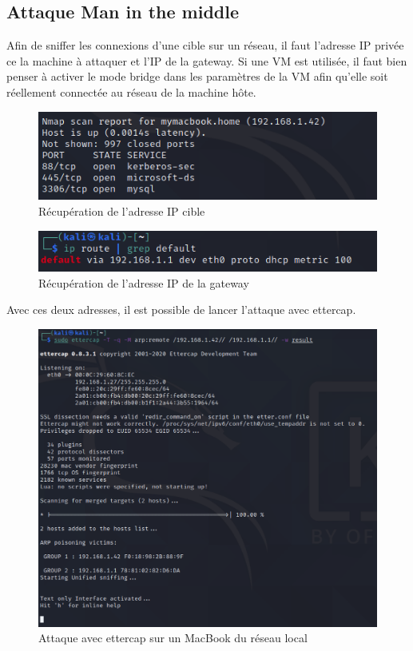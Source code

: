 \documentclass[12pt, oneside]{article}
\begin{document}
\subsection{Attaque Man in the middle}
Afin de sniffer les connexions d'une cible sur un réseau, il faut l'adresse IP privée ce la machine à attaquer et l'IP de la gateway. Si une VM est utilisée, il faut bien penser à activer le mode bridge dans les paramètres de la VM afin qu'elle soit réellement connectée au réseau de la machine hôte.
\begin{figure}[H]
\centering
\includegraphics[scale=0.4]{target}
\caption{Récupération de l'adresse IP cible}
\end{figure}
\begin{figure}[H]
\centering
\includegraphics[scale=0.4]{gateway}
\caption{Récupération de l'adresse IP de la gateway}
\end{figure}
Avec ces deux adresses, il est possible de lancer l'attaque avec ettercap.
\begin{figure}[H]
\centering
\includegraphics[scale=0.4]{ett1}
\caption{Attaque avec ettercap sur un MacBook du réseau local}
\end{figure}
\end{document}
